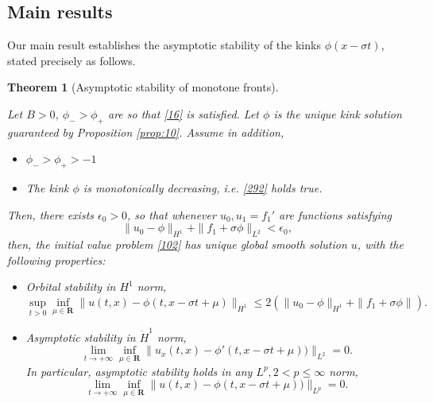 \documentclass[12pt]{amsart}
\newtheorem{theorem}{Theorem}
\theoremstyle{definition}
\theoremstyle{remark}
\numberwithin{equation}{section}
\renewcommand{\(}{\left(}
\renewcommand{\)}{\right)}
\renewcommand{\[}{\left[}
\renewcommand{\]}{\right]}
\newcommand{\si}{\sigma}
\newcommand{\rone}{\mathbf R}
\newcommand{\eps}{\epsilon}
\begin{document}
\subsection{Main results}
Our main result establishes the asymptotic stability of the kinks $\phi(x-\si t)$,  stated precisely as follows. 
\begin{theorem}[Asymptotic stability of monotone fronts]
	\label{theo:10} 
	
	Let $B>0$, $\phi_- > \phi_+$ are so that \eqref{16} is satisfied. Let $\phi$ is the unique kink solution guaranteed by Proposition \ref{prop:10}. Assume in addition, 
	\begin{itemize}
		\item $\phi_->\phi_+>-1$
		\item The kink $\phi$ is monotonically decreasing, i.e. \eqref{292} holds true. 
	\end{itemize}
Then, there exists $\eps_0>0$, so that whenever $u_0, u_1=f_1'$ are functions satisfying 
\begin{equation}
	\label{d:10} 
	\|u_0-\phi\|_{H^1}+\|f_1+\si \phi\|_{L^2}<\eps_0,
\end{equation}
then, the initial value problem \eqref{102} has unique global smooth solution $u$, with the following properties: 
\begin{itemize}
	\item Orbital stability in $H^1$ norm, 
	$$
\sup_{t>0} 	\inf_{\mu\in \rone} \|u(t,x) - \phi(t, x-\si t +\mu)\|_{H^1}\leq 2 (\|u_0-\phi\|_{H^1}+\|f_1+\si \phi\|).
	$$
	\item Asymptotic stability in $\dot{H}^1$ norm, 
	$$
	\lim_{t\to +\infty}	\inf_{\mu\in \rone} \|u_x(t,x) - \phi'(t, x-\si t +\mu))\|_{L^2}=0.
	$$
	In particular, asymptotic stability holds in any $L^p, 2<p\leq \infty$ norm, 
	$$
	\lim_{t\to +\infty}	\inf_{\mu\in \rone} \|u(t,x) - \phi(t, x-\si t +\mu))\|_{L^p}=0.
	$$
\end{itemize}
\end{theorem}
 
\end{document}
